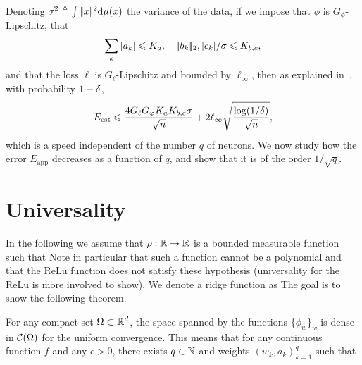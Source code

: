 Denoting
$ \sigma^2 \triangleq \int |\!| x |\!|^2 \mathrm{d} \mu(x)$ the variance of the data,
if we impose that $\phi$ is $G_\phi$-Lipschitz, that
\begin{equation} \label{eq: constraints-radem}
    \sum_k | a_k | \leqslant K_a, \quad
    |\!| b_k |\!|_2, | c_k | / \sigma \leqslant K_{b,c},
\end{equation}
and that the loss $\ell $ is $G_\ell$-Lipschitz and bounded by $\ell_\infty$, then as explained in~\cite[Proposition 9.1]{bach2021book}, with probability $1-\delta$,
\begin{equation}\label{eq:estim-error}
    E_{\text{est}} \leqslant \frac{4 G_\ell G_\varphi K_a K_{b,c} \sigma}{\sqrt{n}} 
    	+ 2\ell_\infty \sqrt{\frac{\log(1/\delta)}{\sqrt{n}}}, 
\end{equation}
which is a speed independent of the number $q$ of neurons.
%
We now study how the error $E_{\text{app}}$ decreases as a function of $q$, and show that it is of the order $1/\sqrt{q}$.
%



\section{Universality}
\label{sec-universality}

In the following we assume that $\rho : \mathbb{R} \rightarrow \mathbb{R}$ is a bounded measurable function such that 
Note in particular that such a function cannot be a polynomial and that the ReLu function does not satisfy these hypothesis (universality for the ReLu is more involved to show).
%
We denote a ridge function as
%
The goal is to show the following theorem.

\begin{thm}\label{thm-universality}
	For any compact set $\Omega \subset \mathbb{R}^d$, the space spanned by the functions $\{\phi_{w}\}_{w}$ is dense in $\mathcal{C}(\Omega)$ for the uniform convergence. This means that for any continuous function $f$ and any $\epsilon>0$, there exists $q \in \mathbb{N}$ and weights $(w_k,a_k)_{k=1}^q$ such that
\end{thm}

